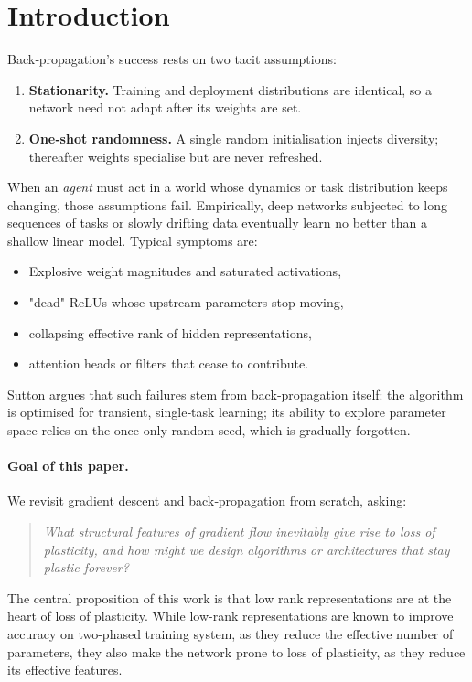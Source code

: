 \documentclass{article}
\begin{document}
\section{Introduction}
Back‑propagation's success rests on two tacit assumptions:
\begin{enumerate}
    \item \textbf{Stationarity.}  Training and deployment distributions are identical, so a network need not adapt after its weights are set.
    \item \textbf{One‑shot randomness.}  A single random initialisation injects diversity; thereafter weights specialise but are never refreshed.
\end{enumerate}
When an \emph{agent} must act in a world whose dynamics or task distribution keeps changing, those assumptions fail.  
Empirically, deep networks subjected to long sequences of tasks or slowly drifting data eventually learn no better than a shallow linear model.  
Typical symptoms are:
\begin{itemize}[nosep]
    \item Explosive weight magnitudes and saturated activations,
    \item "dead" ReLUs whose upstream parameters stop moving,
    \item collapsing effective rank of hidden representations,
    \item attention heads or filters that cease to contribute.
\end{itemize}
Sutton argues that such failures stem from back‑propagation itself: the algorithm is optimised for transient, single‑task learning; its ability to explore parameter space relies on the once‑only random seed, which is gradually forgotten. 

\paragraph{Goal of this paper.}
We revisit gradient descent and back‑propagation from scratch, asking:

\begin{quote}
\emph{What structural features of gradient flow inevitably give rise to loss of plasticity, and how might we design algorithms or architectures that stay plastic forever?}
\end{quote}

The central proposition of this work is that low rank representations are at the heart of loss of plasticity. While low-rank representations are known to improve accuracy on two-phased training system, as they reduce the effective number of parameters, they also make the network prone to loss of plasticity, as they reduce its effective features. 
\end{document}
